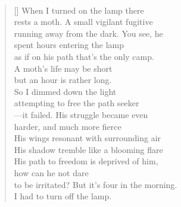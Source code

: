 \documentclass{book}
\begin{document}
\newpage
\poemtitle{\textcolor[RGB]{165,15,15}{The lamp of freedom}}
\hspace*{\fill} \\
\settowidth{\versewidth}{to be irritated? But it's four in the morning.}
\begin{verse}[\versewidth]
    When I turned on the lamp there\\
    rests a moth. A small vigilant fugitive\\
    running away from the dark. You see, he\\
    spent hours entering the lamp\\
    as if on his path that's the only camp.\\
    A moth's life may be short\\
    but an hour is rather long.\\
    So I dimmed down the light\\
    attempting to free the path seeker\\
    ---it failed. His struggle became even\\
    harder, and much more fierce\\
    His wings resonant with surrounding air\\
    His shadow tremble like a blooming flare\\
    His path to freedom is deprived of him, \\
    how can he not dare\\
    to be irritated? But it's four in the morning.\\
    I had to turn off the lamp.\\
\end{verse}
\end{document}
